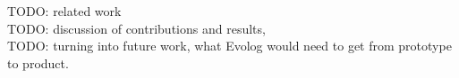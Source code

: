 
TODO: related work\\
TODO: discussion of contributions and results,\\
TODO: turning into future work, what Evolog would need to get from prototype to product.